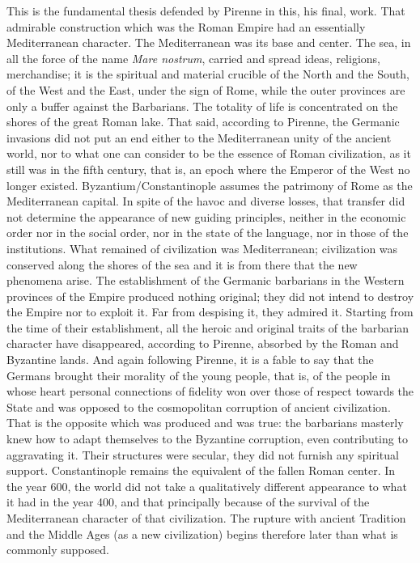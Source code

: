 This is the fundamental thesis defended by Pirenne in this, his final, work. That admirable construction which was the Roman Empire had an essentially Mediterranean character. The Mediterranean was its base and center. The sea, in all the force of the name \emph{Mare nostrum}, carried and spread ideas, religions, merchandise; it is the spiritual and material crucible of the North and the South, of the West and the East, under the sign of Rome, while the outer provinces are only a buffer against the Barbarians. The totality of life is concentrated on the shores of the great Roman lake. That said, according to Pirenne, the Germanic invasions did not put an end either to the Mediterranean unity of the ancient world, nor to what one can consider to be the essence of Roman civilization, as it still was in the fifth century, that is, an epoch where the Emperor of the West no longer existed. Byzantium/Constantinople assumes the patrimony of Rome as the Mediterranean capital. In spite of the havoc and diverse losses, that transfer did not determine the appearance of new guiding principles, neither in the economic order nor in the social order, nor in the state of the language, nor in those of the institutions. What remained of civilization was Mediterranean; civilization was conserved along the shores of the sea and it is from there that the new phenomena arise. The establishment of the Germanic barbarians in the Western provinces of the Empire produced nothing original; they did not intend to destroy the Empire nor to exploit it. Far from despising it, they admired it. Starting from the time of their establishment, all the heroic and original traits of the barbarian character have disappeared, according to Pirenne, absorbed by the Roman and Byzantine lands. And again following Pirenne, it is a fable to say that the Germans brought their morality of the young people, that is, of the people in whose heart personal connections of fidelity won over those of respect towards the State and was opposed to the cosmopolitan corruption of ancient civilization. That is the opposite which was produced and was true: the barbarians masterly knew how to adapt themselves to the Byzantine corruption, even contributing to aggravating it. Their structures were secular, they did not furnish any spiritual support. Constantinople remains the equivalent of the fallen Roman center. In the year 600, the world did not take a qualitatively different appearance to what it had in the year 400, and that principally because of the survival of the Mediterranean character of that civilization. The rupture with ancient Tradition and the Middle Ages (as a new civilization) begins therefore later than what is commonly supposed.

